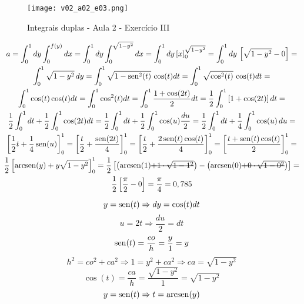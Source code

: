\begin{enumerate}
	\begin{figure}[htb]
		\caption{Integrais duplas - Aula 2 - Exercício III}
		\label{v02_a02_e03}
		\centering
		\texttt{[image: v02\_a02\_e03.png]}		
	\end{figure}
	
	\begin{gather*}
		a = \int_0^1 dy \int_0^{f(y)} dx = \int_0^1 dy \int_0^{\sqrt{1 - y^2}} dx = \int_0^1 dy\, [x]_0^{\sqrt{1 - y^2}} = \int_0^1 dy\, \left[\sqrt{1 - y^2} - 0\right] =\\ \int_0^1 \sqrt{1 - y^2}\, dy = \int_0^1 \sqrt{1 - \sen^2(t)}\, \cos(t) dt = \int_0^1 \sqrt{\cos^2(t)}\, \cos(t) dt =\\ \int_0^1 \cos(t)\cos(t) dt = \int_0^1 \cos^2(t) dt = \int_0^1 \dfrac{1 + \cos(2t)}{2} dt = \dfrac{1}{2}\int_0^1 \left[1 + \cos(2t)\right] dt =\\ \dfrac{1}{2}\int_0^1 dt + \dfrac{1}{2}\int_0^1 \cos(2t) dt = \dfrac{1}{2}\int_0^1 dt + \dfrac{1}{2}\int_0^1 \cos(u) \dfrac{du}{2} = \dfrac{1}{2}\int_0^1 dt + \dfrac{1}{4}\int_0^1 \cos(u)\, du =\\ \left[\dfrac{1}{2}t + \dfrac{1}{4}\sen(u)\right]_0^1 = \left[\dfrac{t}{2} + \dfrac{\sen(2t)}{4}\right]_0^1 = \left[\dfrac{t}{2} + \dfrac{2\sen(t)\cos(t)}{4}\right]_0^1 = \left[\dfrac{t + \sen(t)\cos(t)}{2}\right]_0^1 =\\ \dfrac{1}{2}\left[\arcsen(y) + y\sqrt{1 - y^2}\right]_0^1 = \dfrac{1}{2}\left[\left(\arcsen(1) \overstrike{+ 1 \cdot\sqrt{1 - 1^2}}\right) - \left(\arcsen(0) \overstrike{+ 0 \cdot \sqrt{1 - 0^2}}\right)\right] =\\ \dfrac{1}{2}\left[\dfrac{\pi}{2} - 0\right] = \dfrac{\pi}{4} = 0,785
	\end{gather*}
		
	\begin{equation*}
		y = \operatorname{sen}(t) \Rightarrow dy = \cos(t) dt
	\end{equation*}	
	\begin{equation*}
		u = 2t \Rightarrow \dfrac{du}{2} = dt
	\end{equation*}
	\begin{equation*}
		\operatorname{sen}(t) = \dfrac{co}{h} = \dfrac{y}{1} = y
	\end{equation*}
	\begin{equation*}
		h^2 = co^2 + ca^2 \Rightarrow 1 = y^2 + ca^2 \Rightarrow ca = \sqrt{1 - y^2}
	\end{equation*}
	\begin{equation*}
		\cos(t) = \dfrac{ca}{h} = \dfrac{\sqrt{1 - y^2}}{1} = \sqrt{1 - y^2}
	\end{equation*}
	\begin{equation*}
		y = \operatorname{sen}(t) \Rightarrow t = \operatorname{arcsen}(y)
	\end{equation*}
			

\end{enumerate}
